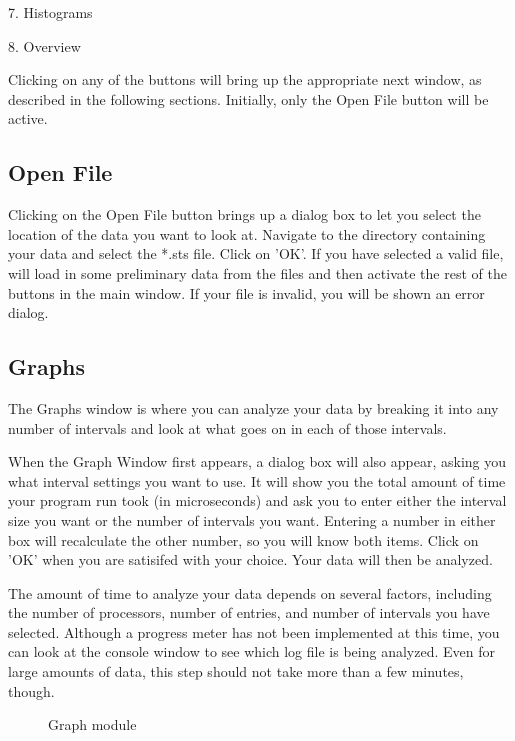 \documentclass[10pt,dvips]{article}
\begin{document}
7. Histograms

8. Overview

Clicking on any of the buttons will bring up the appropriate next window, as
described in the following sections.  Initially, only the Open File button
will be active.

\subsection{Open File}

   Clicking on the Open File button brings up a dialog box to let you select
   the location of the data you want to look at.  Navigate to the directory
   containing your data and select the *.sts file.  Click on 'OK'.  If you
   have selected a valid file, \projections{} will load in some preliminary data
   from the files and then activate the rest of the buttons in the main window.
   If your file is invalid, you will be shown an error dialog.

\subsection{Graphs}

   The Graphs window is where you can analyze your data by breaking it into
   any number of intervals and look at what goes on in each of those intervals.

   When the Graph Window first appears, a dialog box will also appear, asking
   you what interval settings you want to use.  It will show you the total
   amount of time your program run took (in microseconds) and ask you to enter
   either the interval size you want or the number of intervals you want.
   Entering a number in either box will recalculate the other number, so you
   will know both items. Click on 'OK' when you are satisifed with your choice.
   Your data will then be analyzed.

   The amount of time to analyze your data depends on several factors, including
   the number of processors, number of entries, and number of intervals you have
   selected.  Although a progress meter has not been implemented at this time,
   you can look at the console window to see which log file is being analyzed.
   Even for large amounts of data, this step should not take more than a few
   minutes, though.

   \begin{figure}[htb]
   \center
   \caption{Graph module}
   \label{graph}
   \end{figure}
\end{document}
